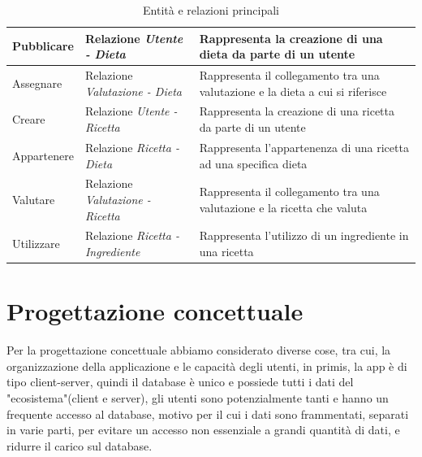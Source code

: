 ﻿\documentclass[a4paper,12pt]{report}
\begin{document}
\begin{table}[h!]
\begin{tabular}{ |p{1.2in}|p{1.2in}|p{2.4in}| }
        \hline
        \scriptsize{Pubblicare} & \scriptsize{Relazione \newline \textit{Utente - Dieta}} & \scriptsize{Rappresenta la creazione di una dieta da parte di un utente} \\
        \hline
        \scriptsize{Assegnare} & \scriptsize{Relazione \newline \textit{Valutazione - Dieta}} & \scriptsize{Rappresenta il collegamento tra una valutazione e la dieta a cui si riferisce} \\
        \hline
        \scriptsize{Creare} & \scriptsize{Relazione \newline \textit{Utente - Ricetta}} & \scriptsize{Rappresenta la creazione di una ricetta da parte di un utente} \\
        \hline
        \scriptsize{Appartenere} & \scriptsize{Relazione \newline \textit{Ricetta - Dieta}} & \scriptsize{Rappresenta l'appartenenza di una ricetta ad una specifica dieta} \\
        \hline
        \scriptsize{Valutare} & \scriptsize{Relazione \newline \textit{Valutazione - Ricetta}} & \scriptsize{Rappresenta il collegamento tra una valutazione e la ricetta che valuta} \\
        \hline
        \scriptsize{Utilizzare} & \scriptsize{Relazione \newline \textit{Ricetta - Ingrediente}} & \scriptsize{Rappresenta l'utilizzo di un ingrediente in una ricetta} \\
        \hline
    \end{tabular}
    \caption{Entità e relazioni principali}
\end{table}

\chapter{Progettazione concettuale}
Per la progettazione concettuale abbiamo considerato diverse cose,
tra cui, la organizzazione della applicazione e le capacità degli utenti,
in primis, la app è di tipo client-server, quindi il database è unico e
possiede tutti i dati del "ecosistema"(client e server), gli utenti sono potenzialmente tanti
e hanno un frequente accesso al database, motivo per il cui i dati sono
frammentati, separati in varie parti, per evitare un accesso non essenziale a grandi quantità di dati, e ridurre il carico sul database.    
\end{document}
